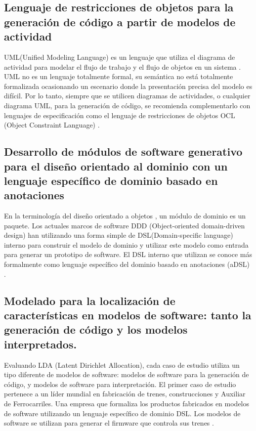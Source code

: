 \subsection{Lenguaje de restricciones de objetos para la generación de código a partir de modelos de actividad}
UML(Unified Modeling Language) es un lenguaje que utiliza el diagrama de actividad para modelar el flujo de trabajo y el flujo de objetos en un sistema \cite{Improving}. UML no es un lenguaje totalmente formal, su semántica no está totalmente formalizada ocasionando un escenario donde la presentación precisa del modelo es difícil. Por lo tanto, siempre que se utilicen diagramas de actividades, o cualquier diagrama UML, para la generación de código, se recomienda complementarlo con lenguajes de especificación como el lenguaje de restricciones de objetos OCL (Object Constraint Language) \cite{Object}.   

\subsection{Desarrollo de módulos de software generativo para el diseño orientado al dominio con un lenguaje específico de dominio basado en anotaciones}
En la terminología del diseño orientado a objetos \cite{Feature}, un módulo de dominio es un paquete. Los actuales marcos de software DDD (Object-oriented domain-driven design) han utilizando una forma simple de DSL(Domain-specific language) interno para construir el modelo de dominio y utilizar este modelo como entrada para generar un prototipo de software. El DSL interno que utilizan se conoce más formalmente como lenguaje específico del dominio basado en anotaciones (aDSL) \cite{Generative}. 

\subsection{Modelado para la localización de características en modelos de software: tanto la generación de código y los modelos interpretados.}
Evaluando LDA (Latent Dirichlet Allocation), cada caso de estudio utiliza un tipo diferente de modelos de software: modelos de software para la generación de código, y modelos de software para interpretación. El primer caso de estudio pertenece a un líder mundial en fabricación de trenes, construcciones y Auxiliar de Ferrocarriles. Una empresa que formaliza los productos fabricados en modelos de software utilizando un lenguaje específico de dominio DSL. Los modelos de software se utilizan para generar el firmware que controla sus trenes \cite{Topic}. 

